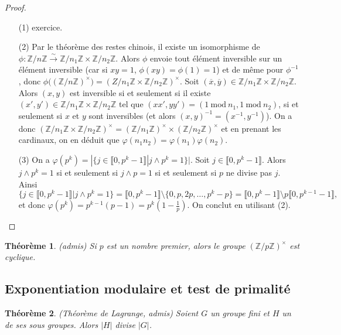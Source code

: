 \documentclass[12pt]{report}
\newtheorem{thm}{Théorème}[chapter]
\newtheorem{theoreme}[thm]{Théorème}
\newcommand{\Z}{\mathbb{Z}}
\begin{document}
\begin{proof}\
\begin{itemize}
\item[(1)]  exercice.


\item[(2)] Par le théorème des restes chinois, il existe un isomorphisme de  $\phi:\Z/n\Z\overset{\sim}{\rightarrow}\Z/n_1\Z\times \Z/n_2 \Z$. Alors $\phi$ envoie tout élément inversible sur un élément inversible (car si $xy=1$, $\phi(xy)=\phi(1)=1$) et de même pour $\phi^{-1}$, donc $\phi\big((\Z/n\Z)^\times\big)=(Z/n_1\Z\times \Z/n_2\Z)^\times$. Soit $(\overline{x},\overline{y})\in \Z/n_1\Z\times \Z/n_2\Z$. Alors $(x,y)$ est inversible si et seulement si il existe $(x',y')\in  \Z/n_1\Z\times \Z/n_2\Z$ tel que $(xx',yy')=(1\mathrm{\ mod\ }n_1,1\mathrm{\ mod\ }n_2)$, si et seulement si $x$ et $y$ sont inversibles (et alors $(x,y)^{-1}=(x^{-1},y^{-1})$). On a donc   $(\Z/n_1\Z\times \Z/n_2 \Z)^{\times}=(\Z/n_1\Z)^\times \times (\Z/n_2\Z)^\times$ et en prenant les cardinaux, on en déduit que $\varphi(n_1n_2)=\varphi(n_1)\varphi(n_2)$. 



\item[(3)] On a $\varphi(p^k)=|\{j\in \llbracket 0,p^k-1\rrbracket| j\wedge p^k=1\}|$. Soit $j\in \llbracket 0,p^k-1\rrbracket$. Alors $j\wedge p^k=1$ si et seulement si $j\wedge p=1$ si et seulement si $p$ ne divise pas $j$. Ainsi \[\{j\in \llbracket 0,p^k-1\rrbracket| j\wedge p^k=1\}= \llbracket 0,p^k-1\rrbracket\setminus \{0,p,2p,\ldots, p^k-p\}=\llbracket 0,p^k-1\rrbracket \setminus p\llbracket 0,p^{k-1}-1\rrbracket,\] et donc $\varphi(p^k)=p^{k-1}(p-1)=p^k(1-\frac{1}{p})$. On conclut en utilisant (2).
\end{itemize}
\end{proof}


\begin{thm}(admis)
Si $p$ est un nombre premier, alors le groupe $(\mathbb{Z}/p \mathbb{Z})^{\times}$ est cyclique.
\end{thm}

\subsection{Exponentiation modulaire et test de primalité}


\begin{theoreme}\label{thmLagrange}(Théorème de Lagrange, admis)
Soient $G$ un groupe fini et $H$ un de ses sous groupes. Alors $|H|$ divise $|G|$.
\end{theoreme}
\end{document}
